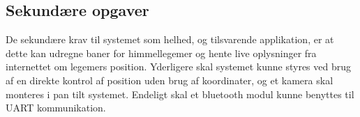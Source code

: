 
\subsection{Sekundære opgaver}

De sekundære krav til systemet som helhed, og tilsvarende applikation, er at dette kan udregne baner for himmellegemer og hente live oplysninger fra internettet om legemers position. Yderligere skal systemet kunne styres ved brug af en direkte kontrol af position uden brug af koordinater, og et kamera skal monteres i pan tilt systemet. Endeligt skal et bluetooth modul kunne benyttes til UART kommunikation.

